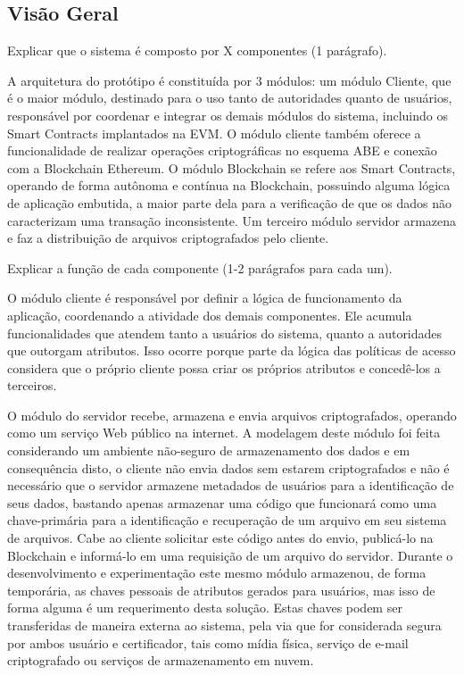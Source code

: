 \documentclass[a4paper,11pt]{article}
\begin{document}
\subsection{Visão Geral}
\label{sec:sub:visaogeral}

{\color{ForestGreen}Explicar que o sistema é composto por X componentes (1 parágrafo).}

A arquitetura do protótipo é constituída por 3 módulos: um módulo Cliente, que é o maior módulo, destinado para o uso tanto de autoridades quanto de usuários, responsável por coordenar e integrar os demais módulos do sistema, incluindo os Smart Contracts implantados na EVM.
O módulo cliente também oferece a funcionalidade de realizar operações criptográficas no esquema ABE e conexão com a Blockchain Ethereum.
O módulo Blockchain se refere aos Smart Contracts, operando de forma autônoma e contínua na Blockchain, possuindo alguma lógica de aplicação embutida, a maior parte dela para a verificação de que os dados não caracterizam uma transação inconsistente.
Um terceiro módulo servidor armazena e faz a distribuição de arquivos criptografados pelo cliente.

{\color{ForestGreen}Explicar a função de cada componente (1-2 parágrafos para cada um).}

O módulo cliente é responsável por definir a lógica de funcionamento da aplicação, coordenando a atividade dos demais componentes.
Ele acumula funcionalidades que atendem tanto a usuários do sistema, quanto a autoridades que outorgam atributos.
Isso ocorre porque parte da lógica das políticas de acesso considera que o próprio cliente possa criar os próprios atributos e concedê-los a terceiros.

O módulo do servidor recebe, armazena e envia arquivos criptografados, operando como um serviço Web público na internet.
A modelagem deste módulo foi feita considerando um ambiente não-seguro de armazenamento dos dados e em consequência disto, o cliente não envia dados sem estarem criptografados e não é necessário que o servidor armazene metadados de usuários para a identificação de seus dados, bastando apenas armazenar uma código que funcionará como uma chave-primária para a identificação e recuperação de um arquivo em seu sistema de arquivos.
Cabe ao cliente solicitar este código antes do envio, publicá-lo na Blockchain e informá-lo em uma requisição de um arquivo do servidor.
Durante o desenvolvimento e experimentação este mesmo módulo armazenou, de forma temporária, as chaves pessoais de atributos gerados para usuários, mas isso de forma alguma é um requerimento desta solução.
Estas chaves podem ser transferidas de maneira externa ao sistema, pela via que for considerada segura por ambos usuário e certificador, tais como mídia física, serviço de e-mail criptografado ou serviços de armazenamento em nuvem.
\end{document}
